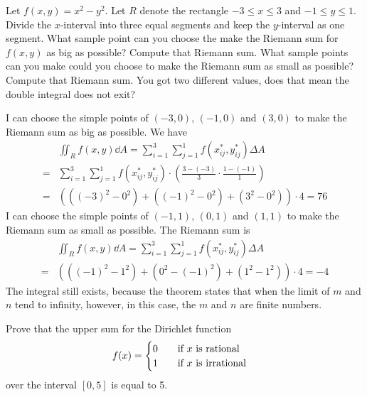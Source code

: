 \documentclass[10pt,twocolumn]{article}
\begin{document}
\begin{exercise}{4}
  Let $f(x,y)=x^2-y^2$. Let $R$ denote the rectangle $-3\le x \le 3$ and $-1\le
  y \le 1$. Divide the $x$-interval into three equal segments and keep the
  $y$-interval as one segment. What sample point can you choose the make the
  Riemann sum for $f(x,y)$ as big as possible? Compute that Riemann sum. What
  sample points can you make could you choose to make the Riemann sum as small
  as possible? Compute that Riemann sum. You got two different values, does
  that mean the double integral does not exit?
\end{exercise}

\begin{answer}{4}
  I can choose the simple points of $(-3, 0)$, $(-1, 0)$ and $(3, 0)$ to make
  the Riemann sum as big as possible. We have
  \begin{align*}
    &\iint_{R}f(x,y)\dd{A} = \sum_{i=1}^3 \sum_{j=1}^1
                            f(x_{ij}^*, y_{ij}^*) \Delta A \\
    =&\sum_{i=1}^3 \sum_{j=1}^1 f(x_{ij}^*, y_{ij}^*) \cdot
    (\frac{3-(-3)}{3}\cdot \frac{1-(-1)}{1}) \\
    =&(((-3)^2 - 0^2) + ((-1)^2 - 0^2) + (3^2 - 0^2)) \cdot 4 = 76
  \end{align*}
  I can choose the simple points of $(-1, 1)$, $(0, 1)$ and $(1, 1)$ to make
  the Riemann sum as small as possible. The Riemann sum is
  \begin{align*}
    &\iint_{R}f(x,y)\dd{A} = \sum_{i=1}^3 \sum_{j=1}^1
                            f(x_{ij}^*, y_{ij}^*) \Delta A \\
    =&(((-1)^2 - 1^2) + (0^2 - (-1)^2) + (1^2 - 1^2)) \cdot 4 = -4
  \end{align*}
  The integral still exists, because the theorem states that when the limit of
  $m$ and $n$ tend to infinity, however, in this case, the $m$ and $n$ are
  finite numbers.
\end{answer}

\begin{exercise}{5}
  Prove that the upper sum for the Dirichlet function
  \[
    f(x) = \begin{cases}
      0& \qq{if $x$ is rational}\\
      1& \qq{if $x$ is irrational}
    \end{cases}
  \]
  over the interval $[0,5]$ is equal to 5.
\end{exercise}
\end{document}
